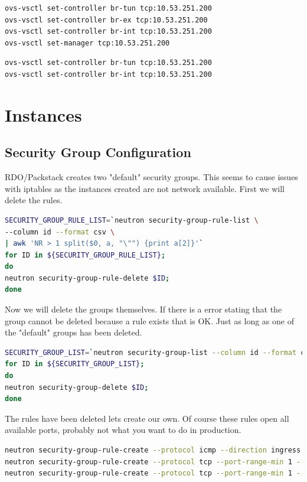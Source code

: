 \documentclass[11pt,letterpaper,oneside]{book}
\begin{document}
\begin{lstlisting}[caption={Neutron node set controller and manager},language=bash]
ovs-vsctl set-controller br-tun tcp:10.53.251.200
ovs-vsctl set-controller br-ex tcp:10.53.251.200
ovs-vsctl set-controller br-int tcp:10.53.251.200
ovs-vsctl set-manager tcp:10.53.251.200
\end{lstlisting}

\begin{lstlisting}[caption={Nova node set controller},language=bash]
ovs-vsctl set-controller br-tun tcp:10.53.251.200
ovs-vsctl set-controller br-int tcp:10.53.251.200
\end{lstlisting}


\chapter{Instances}
\section{Security Group Configuration}
RDO/Packstack creates two "default" security groups.  This seems to cause issues with iptables as the instances created are not network available.  First we will delete the rules.

\begin{lstlisting}[caption={Delete existing security group rules},language=bash]
SECURITY_GROUP_RULE_LIST=`neutron security-group-rule-list \
--column id --format csv \
| awk 'NR > 1 split($0, a, "\"") {print a[2]}'`
for ID in ${SECURITY_GROUP_RULE_LIST}; 
do 
neutron security-group-rule-delete $ID; 
done
\end{lstlisting}

Now we will delete the groups themselves.  If there is a error stating that the group cannot be deleted because a rule exists that is OK.  Just as long as one of the "default" groups has been deleted.
\begin{lstlisting}[caption={Delete existing security groups},language=bash]
SECURITY_GROUP_LIST=`neutron security-group-list --column id --format csv | awk 'NR > 1 split($0, a, "\"") {print a[2]}'`
for ID in ${SECURITY_GROUP_LIST}; 
do 
neutron security-group-delete $ID; 
done
\end{lstlisting}

The rules have been deleted lets create our own.  Of course these rules open all available ports, probably not what you want to do in production.  
\begin{lstlisting}[caption={},language=bash]
neutron security-group-rule-create --protocol icmp --direction ingress default 
neutron security-group-rule-create --protocol tcp --port-range-min 1 --port-range-max 65535 --direction ingress default 
neutron security-group-rule-create --protocol tcp --port-range-min 1 --port-range-max 65535 --direction egress default 
\end{lstlisting}
\end{document}
